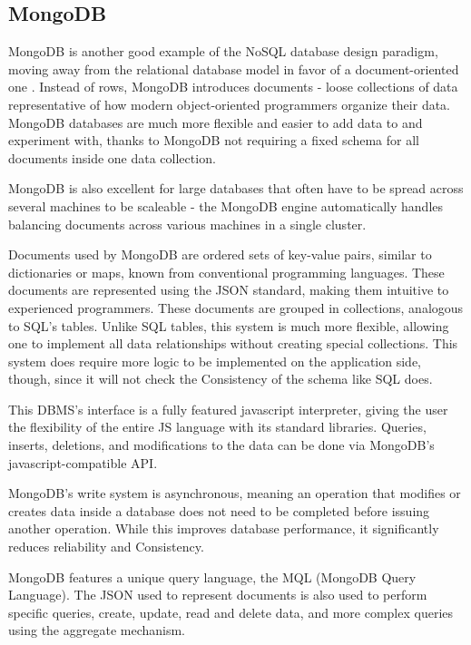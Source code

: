 \subsection{MongoDB}
\label{subsec:background:second_section:second_subsection}
\par MongoDB is another good example of the NoSQL database design paradigm, moving away from the relational database model in favor of a document-oriented one \citep{mongoDB}. Instead of rows, MongoDB introduces documents - loose collections of data representative of how modern object-oriented programmers organize their data. MongoDB databases are much more flexible and easier to add data to and experiment with, thanks to MongoDB not requiring a fixed schema for all documents inside one data collection.
\par MongoDB is also excellent for large databases that often have to be spread across several machines to be scaleable - the MongoDB engine automatically handles balancing documents across various machines in a single cluster\citep{mongoDB}. 
\par Documents used by MongoDB are ordered sets of key-value pairs, similar to dictionaries or maps, known from conventional programming languages. These documents are represented using the JSON standard, making them intuitive to experienced programmers. These documents are grouped in collections, analogous to SQL's tables\citep{mongoDB}. Unlike SQL tables, this system is much more flexible, allowing one to implement all data relationships without creating special collections. This system does require more logic to be implemented on the application side, though, since it will not check the Consistency of the schema like SQL does\citep{MongovMySQL}.
\par This DBMS's interface is a fully featured javascript interpreter, giving the user the flexibility of the entire JS language with its standard libraries. Queries, inserts, deletions, and modifications to the data can be done via MongoDB's javascript-compatible API\citep{mongoDB}.
\par MongoDB's write system is asynchronous, meaning an operation that modifies or creates data inside a database does not need to be completed before issuing another operation. While this improves database performance, it significantly reduces reliability and Consistency\citep{MongovMySQL}.
\par MongoDB features a unique query language, the MQL (MongoDB Query Language). The JSON used to represent documents is also used to perform specific queries, create, update, read and delete data, and more complex queries using the aggregate mechanism. 

